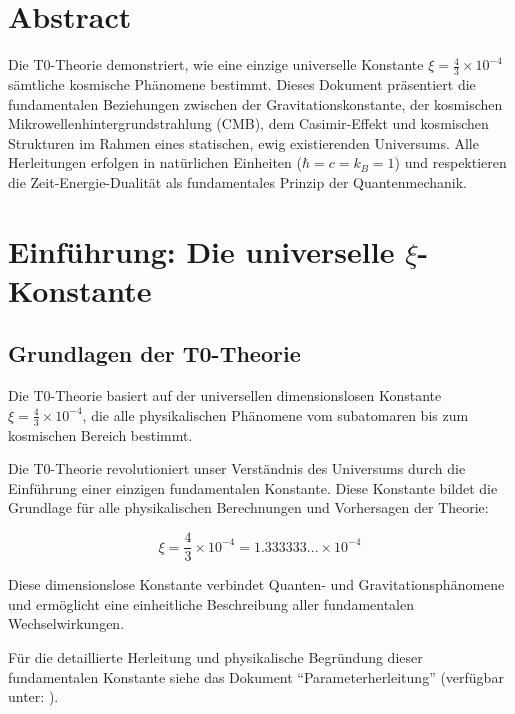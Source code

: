 \section*{Abstract}
		Die T0-Theorie demonstriert, wie eine einzige universelle Konstante $\xi = \frac{4}{3} \times 10^{-4}$ sämtliche kosmische Phänomene bestimmt. Dieses Dokument präsentiert die fundamentalen Beziehungen zwischen der Gravitationskonstante, der kosmischen Mikrowellenhintergrundstrahlung (CMB), dem Casimir-Effekt und kosmischen Strukturen im Rahmen eines statischen, ewig existierenden Universums. Alle Herleitungen erfolgen in natürlichen Einheiten ($\hbar = c = k_B = 1$) und respektieren die Zeit-Energie-Dualität als fundamentales Prinzip der Quantenmechanik.

	
	
	\section{Einführung: Die universelle $\xi$-Konstante}
	
\subsection{Grundlagen der T0-Theorie}

\begin{important}
	Die T0-Theorie basiert auf der universellen dimensionslosen Konstante $\xi = \frac{4}{3} \times 10^{-4}$, die alle physikalischen Phänomene vom subatomaren bis zum kosmischen Bereich bestimmt.
\end{important}

Die T0-Theorie revolutioniert unser Verständnis des Universums durch die Einführung einer einzigen fundamentalen Konstante. Diese Konstante bildet die Grundlage für alle physikalischen Berechnungen und Vorhersagen der Theorie:

\begin{equation}
	\xi = \frac{4}{3} \times 10^{-4} = 1.333333... \times 10^{-4}
\end{equation}

Diese dimensionslose Konstante verbindet Quanten- und Gravitationsphänomene und ermöglicht eine einheitliche Beschreibung aller fundamentalen Wechselwirkungen.

\begin{tcolorbox}[colback=yellow!10!white,colframe=yellow!50!black,title=Hinweis zur Herleitung]
	Für die detaillierte Herleitung und physikalische Begründung dieser fundamentalen Konstante siehe das Dokument ``Parameterherleitung'' (verfügbar unter: ).
\end{tcolorbox}

